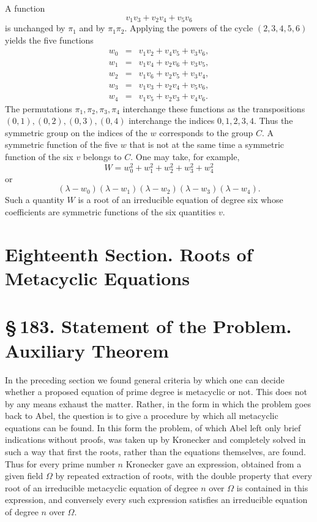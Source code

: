 \documentclass[11pt]{article}
\providecommand{\sect}[2]{\section*{\S\,#1. #2}}
\begin{document}
A function
\[
  v_1v_3+v_2v_4+v_5v_6
\]
is unchanged by $\pi_1$ and by $\pi_1\pi_2$. Applying the powers of the cycle $(2,3,4,5,6)$ yields the five functions
\[
\begin{array}{rcl}
 w_0&=&v_1v_2+v_4v_5+v_3v_6,\\
 w_1&=&v_1v_4+v_2v_6+v_3v_5,\\
 w_2&=&v_1v_6+v_2v_5+v_3v_4,\\
 w_3&=&v_1v_3+v_2v_4+v_5v_6,\\
 w_4&=&v_1v_5+v_2v_3+v_4v_6.
\end{array}                                                       \tag{2}
\]
The permutations $\pi_1,\pi_2,\pi_3,\pi_4$ interchange these functions as the transpositions $(0,1),(0,2),(0,3),(0,4)$ interchange the indices $0,1,2,3,4$. Thus the symmetric group on the indices of the $w$ corresponds to the group $C$. A symmetric function of the five $w$ that is not at the same time a symmetric function of the six $v$ belongs to $C$. One may take, for example,
\[
  W=w_0^2+w_1^2+w_2^2+w_3^2+w_4^2
\]
or
\[
  (\lambda-w_0)(\lambda-w_1)(\lambda-w_2)(\lambda-w_3)(\lambda-w_4).
\]
Such a quantity $W$ is a root of an irreducible equation of degree six whose coefficients are symmetric functions of the six quantities $v$.



\section*{Eighteenth Section. Roots of Metacyclic Equations}

\sect{183}{Statement of the Problem. Auxiliary Theorem}

In the preceding section we found general criteria by which one can decide whether a proposed equation of prime degree is metacyclic or not. This does not by any means exhaust the matter. Rather, in the form in which the problem goes back to Abel, the question is to give a procedure by which all metacyclic equations can be found. In this form the problem, of which Abel left only brief indications without proofs, was taken up by Kronecker and completely solved in such a way that first the roots, rather than the equations themselves, are found. Thus for every prime number $n$ Kronecker gave an expression, obtained from a given field $\Omega$ by repeated extraction of roots, with the double property that every root of an irreducible metacyclic equation of degree $n$ over $\Omega$ is contained in this expression, and conversely every such expression satisfies an irreducible equation of degree $n$ over $\Omega$.
\end{document}
